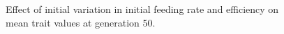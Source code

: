 \begin{figure}[p]
  \caption{Effect of initial variation in initial feeding rate and efficiency on mean trait values at generation 50.}
  \label{fig:ivar_fr_eff}
\end{figure}
